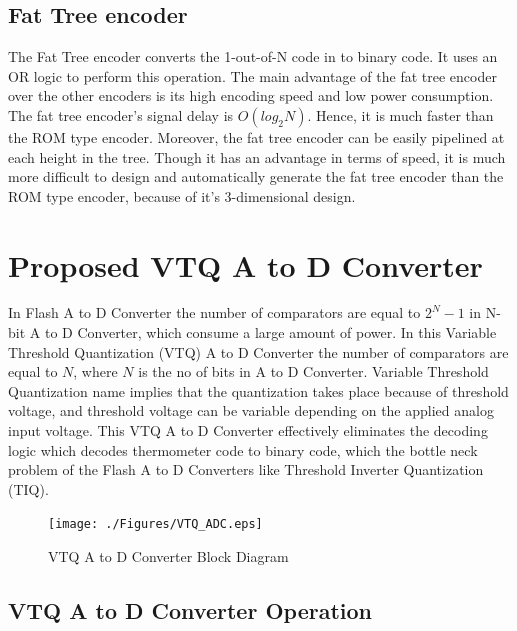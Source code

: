 \subsection{Fat Tree encoder}

\par
\hspace{1.2cm}The Fat Tree encoder converts the 1-out-of-N code in to binary code. It uses an OR logic to perform this operation. The main advantage of the fat tree encoder over the other encoders is its high encoding speed and low power consumption. The fat tree encoder's signal delay is $O(log_2N)$. Hence, it is much faster than the ROM type encoder. Moreover, the fat tree encoder can be easily pipelined at each height in the tree. Though it has an advantage in terms of speed, it is much more difficult to design and automatically generate the fat tree encoder than the ROM type encoder, because of it's 3-dimensional design.


\section{Proposed VTQ A to D Converter}

\par
\hspace{1.2cm}In Flash A to D Converter the number of comparators are equal to $2^N−1$ in N-bit A to D Converter, which consume a large amount of power. In this Variable Threshold Quantization (VTQ) A to D Converter the number of comparators are equal to $N$, where $N$ is the no of bits in A to D Converter. Variable Threshold Quantization name implies that the quantization takes place because of threshold voltage, and threshold voltage can be variable depending on the applied analog input voltage. This VTQ A to D Converter effectively eliminates the decoding logic which decodes thermometer code to binary code, which the bottle neck problem of the Flash A to D Converters like Threshold Inverter Quantization (TIQ).

\begin{figure}[ht]
\begin{center}
\texttt{[image: ./Figures/VTQ\_ADC.eps]}
\caption{VTQ A to D Converter Block Diagram }
\label{fig:VTQ_ADC}
\end{center}
\end{figure}

\subsection{VTQ A to D Converter Operation}

